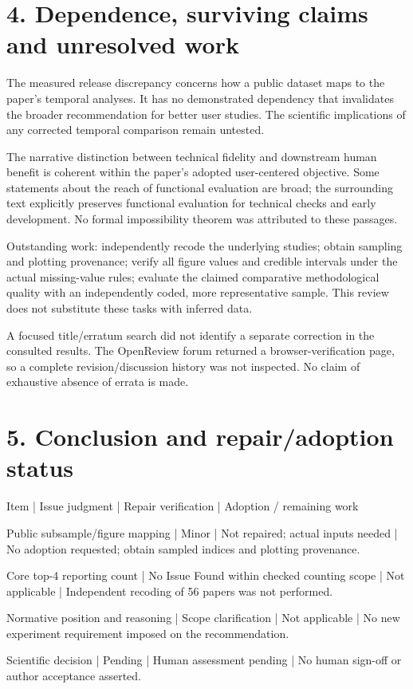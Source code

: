 \documentclass[10pt]{article}
\begin{document}
\section*{4. Dependence, surviving claims and unresolved work}
The measured release discrepancy concerns how a public dataset maps to the paper’s temporal analyses. It has no demonstrated dependency that invalidates the broader recommendation for better user studies. The scientific implications of any corrected temporal comparison remain untested.\par
The narrative distinction between technical fidelity and downstream human benefit is coherent within the paper’s adopted user-centered objective. Some statements about the reach of functional evaluation are broad; the surrounding text explicitly preserves functional evaluation for technical checks and early development. No formal impossibility theorem was attributed to these passages.\par
Outstanding work: independently recode the underlying studies; obtain sampling and plotting provenance; verify all figure values and credible intervals under the actual missing-value rules; evaluate the claimed comparative methodological quality with an independently coded, more representative sample. This review does not substitute these tasks with inferred data.\par
A focused title/erratum search did not identify a separate correction in the consulted results. The OpenReview forum returned a browser-verification page, so a complete revision/discussion history was not inspected. No claim of exhaustive absence of errata is made.\par
\section*{5. Conclusion and repair/adoption status}
Item | Issue judgment | Repair verification | Adoption / remaining work\par
Public subsample/figure mapping | Minor | Not repaired; actual inputs needed | No adoption requested; obtain sampled indices and plotting provenance.\par
Core top-4 reporting count | No Issue Found within checked counting scope | Not applicable | Independent recoding of 56 papers was not performed.\par
Normative position and reasoning | Scope clarification | Not applicable | No new experiment requirement imposed on the recommendation.\par
Scientific decision | Pending | Human assessment pending | No human sign-off or author acceptance asserted.\par
\end{document}
